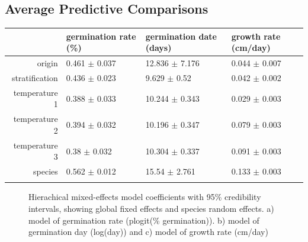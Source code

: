 \documentclass[12pt]{article}\usepackage[]{graphicx}\usepackage[]{color}
\begin{document}
	\subsection{Average Predictive Comparisons}
\begin{longtable}{rlll}
	\hline
	& germination rate (\%) & germination date (days) & growth rate (cm/day) \\ 
	\hline
	origin & 0.461 $\pm$ 0.037 & 12.836 $\pm$ 7.176 & 0.044 $\pm$ 0.007 \\ 
	stratification & 0.436 $\pm$ 0.023 & 9.629 $\pm$ 0.52 & 0.042 $\pm$ 0.002 \\ 
	temperature 1 & 0.388 $\pm$ 0.033 & 10.244 $\pm$ 0.343 & 0.029 $\pm$ 0.003 \\ 
	temperature 2 & 0.394 $\pm$ 0.032 & 10.196 $\pm$ 0.347 & 0.079 $\pm$ 0.003 \\ 
	temperature 3 & 0.38 $\pm$ 0.032 & 10.304 $\pm$ 0.337 & 0.091 $\pm$ 0.003 \\ 
	species & 0.562 $\pm$ 0.012 & 15.54 $\pm$ 2.761 & 0.133 $\pm$ 0.003 \\ 
	\hline
	\hline
	\label{tab:apc}
\end{longtable}
\begin{figure}
	\caption{Hierachical mixed-effects model coefficients with 95\% credibility intervals, showing global fixed effects and species random effects. a) model of germination rate (plogit(\% germination)). b) model of germination day (log(day)) and c) model of growth rate (cm/day)}
	\label{fig:coef}
\end{figure}
	
\end{document}
